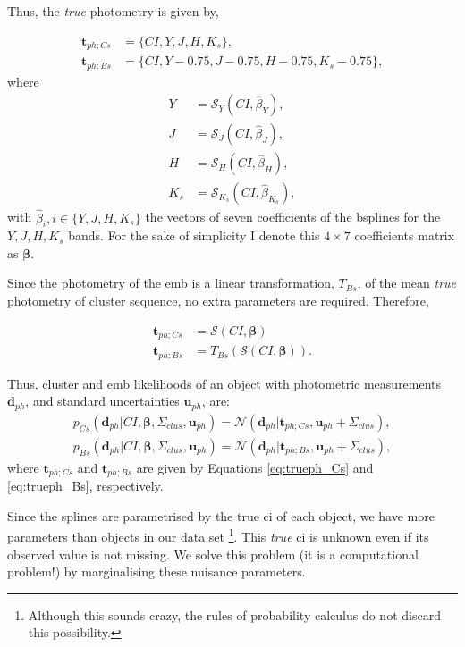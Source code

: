Thus, the \emph{true} photometry is given by,

\begin{align}
\mathbf{t}_{ph;Cs}&= \{CI,Y,J,H,K_s\},\nonumber \\
\mathbf{t}_{ph;Bs}&=\{CI,Y-0.75,J-0.75,H-0.75,K_s-0.75\}, \nonumber
\end{align}
where
\begin{align}
\label{eq:spline_Y}
Y &=\mathcal{S}_Y(CI,\hat{\beta}_Y),\\
\label{eq:spline_J}
J &=\mathcal{S}_J(CI,\hat{\beta}_J),\\
\label{eq:spline_H}
 H &=\mathcal{S}_H(CI,\hat{\beta}_H), \\
 \label{eq:spline_K}
 K_s &=\mathcal{S}_{K_s}(CI,\hat{\beta}_{K_s}), 
\end{align}
with $\hat{\beta}_{i}, i\in\{Y,J,H,K_s\}$ the vectors of seven coefficients of the \glspl{bspline} for the $Y,J,H,K_s$ bands.  For the sake of simplicity I denote this $4\times7$ coefficients matrix as $\boldsymbol{\beta}$.

Since the photometry of the \gls{emb} is a linear transformation, $T_{Bs}$, of the mean \emph{true} photometry of cluster sequence, no extra parameters are required. Therefore, 

\begin{align}
\mathbf{t}_{ph;Cs} &= \boldsymbol{\mathcal{S}}(CI, \boldsymbol{\beta}) \label{eq:trueph_Cs}\\
\mathbf{t}_{ph;Bs} &=T_{Bs}( \boldsymbol{\mathcal{S}}(CI, \boldsymbol{\beta})).
\label{eq:trueph_Bs}
\end{align}

Thus, cluster and \gls{emb} likelihoods of an object with photometric measurements $\mathbf{d}_{ph}$, and standard uncertainties $\mathbf{u}_{ph}$, are:
\begin{align}
\label{eq:lik-seq}
 p_{Cs}(\mathbf{d}_{ph}| CI, \boldsymbol{\beta},\Sigma_{clus},\mathbf{u}_{ph})={\mathcal{N}}(\mathbf{d}_{ph}|\mathbf{t}_{ph;Cs}, \mathbf{u}_{ph}+\Sigma_{clus}),\nonumber \\
p_{Bs}(\mathbf{d}_{ph}| CI, \boldsymbol{\beta},\Sigma_{clus}, \mathbf{u}_{ph})={\mathcal{N}}(\mathbf{d}_{ph}|\mathbf{t}_{ph;Bs}, \mathbf{u}_{ph}+\Sigma_{clus}),
\end{align}
where $\mathbf{t}_{ph;Cs}$ and $\mathbf{t}_{ph;Bs}$ are given by Equations \ref{eq:trueph_Cs} and \ref{eq:trueph_Bs}, respectively.

Since the splines are parametrised by the true \gls{ci} of each object, we have more parameters than objects in our data set \footnote{Although this sounds crazy, the rules of probability calculus do not discard this possibility.}. This \emph{true} \gls{ci} is unknown even if its observed value is not missing. We solve this problem (it is a computational problem!) by marginalising these nuisance parameters. 

